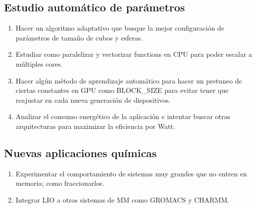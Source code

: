 \subsection{Estudio autom\'atico de par\'ametros}
\begin{enumerate}
  \item Hacer un algoritmo adaptativo que busque la mejor configuraci\'on de par\'ametros de tama\~no de cubos y esferas.
  \item Estudiar como paralelizar y vectorizar functions en CPU para poder escalar a m\'ultiples cores.
  \item Hacer alg\'un m\'etodo de aprendizaje autom\'atico para hacer un pretuneo de ciertas constantes en GPU como
    BLOCK\_SIZE para evitar tener que reajustar en cada nueva generaci\'on de dispositivos.
  \item Analizar el consumo energ\'etico de la aplicaci\'on e intentar buscar otras arquitecturas para maximizar
    la eficiencia por Watt.
\end{enumerate}

\subsection{Nuevas aplicaciones qu\'imicas}
\begin{enumerate}
  \item Experimentar el comportamiento de sistemas muy grandes que no entren en memoria; como fraccionarlos.
  \item Integrar LIO a otros sistemas de MM como GROMACS y CHARMM.
\end{enumerate}
